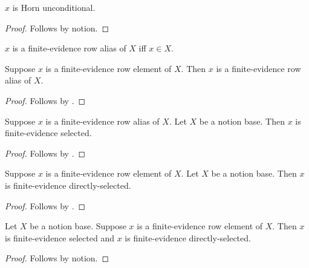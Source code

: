 \begin{proposition}\label{notion_horn_unconditional_consumer}
    $x$ is Horn unconditional.
\end{proposition}
\begin{proof}
    Follows by notion.
\end{proof}

\begin{definition}\label{notion_finite_evidence_row_alias}
    $x$ is a finite-evidence row alias of $X$ iff $x\in X$.
\end{definition}

\begin{classification}\label{notion_finite_evidence_row_intro}
    Suppose $x$ is a finite-evidence row element of $X$.
    Then $x$ is a finite-evidence row alias of $X$.
\end{classification}
\begin{proof}
    Follows by .
\end{proof}

\begin{classification}\label{notion_finite_evidence_from_membership}
    Suppose $x$ is a finite-evidence row alias of $X$.
    Let $X$ be a notion base.
    Then $x$ is finite-evidence selected.
\end{classification}
\begin{proof}
    Follows by .
\end{proof}

\begin{classification}\label{notion_finite_evidence_direct_row}
    Suppose $x$ is a finite-evidence row element of $X$.
    Let $X$ be a notion base.
    Then $x$ is finite-evidence directly-selected.
\end{classification}
\begin{proof}
    Follows by .
\end{proof}

\begin{proposition}\label{notion_finite_evidence_direct_client}
    Let $X$ be a notion base.
    Suppose $x$ is a finite-evidence row element of $X$.
    Then $x$ is finite-evidence selected and
        $x$ is finite-evidence directly-selected.
\end{proposition}
\begin{proof}
    Follows by notion.
\end{proof}

